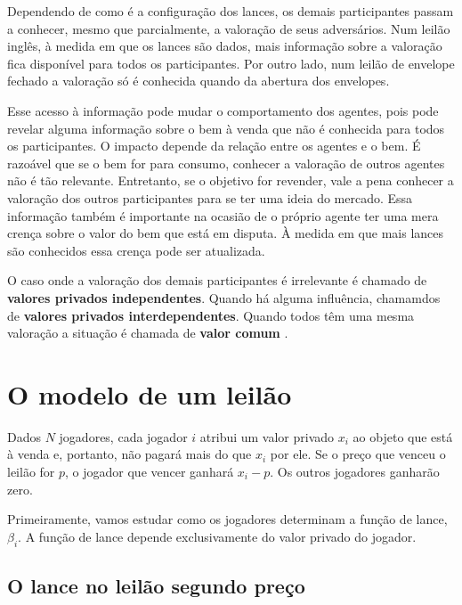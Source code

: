 Dependendo de como é a configuração dos lances, os demais participantes passam a conhecer, mesmo que parcialmente, a valoração de seus adversários. Num leilão inglês, à medida em que os lances são dados, mais informação sobre a valoração fica disponível para todos os participantes. Por outro lado, num leilão de envelope fechado a valoração só é conhecida quando da abertura dos envelopes.

Esse acesso à informação pode mudar o comportamento dos agentes, pois pode revelar alguma informação sobre o bem à venda que não é conhecida para todos os participantes. O impacto depende da relação entre os agentes e o bem. É razoável que se o bem for para consumo, conhecer a valoração de outros agentes não é tão relevante. Entretanto, se o objetivo for revender, vale a pena conhecer a valoração dos outros participantes para se ter uma ideia do mercado. Essa informação também é importante na ocasião de o próprio agente ter uma mera crença sobre o valor do bem que está em disputa. À medida em que mais lances são conhecidos essa crença pode ser atualizada.

O caso onde a valoração dos demais participantes é irrelevante é chamado de \textbf{valores privados independentes}. Quando há alguma influência, chamamdos de \textbf{valores privados interdependentes}. Quando todos têm uma mesma valoração a situação é chamada de \textbf{valor comum} \citet{krishna}.

\section{O modelo de um leilão}

Dados $N$ jogadores, cada jogador $i$ atribui um valor privado $x_i$ ao objeto que está à venda e, portanto, não pagará mais do que $x_i$ por ele. Se o preço que venceu o leilão for $p$, o jogador que vencer ganhará $x_i - p$. Os outros jogadores ganharão zero.

Primeiramente, vamos estudar como os jogadores determinam a função de lance, $\beta_i$. A função de lance depende exclusivamente do valor privado do jogador.

\subsection{O lance no leilão segundo preço}

